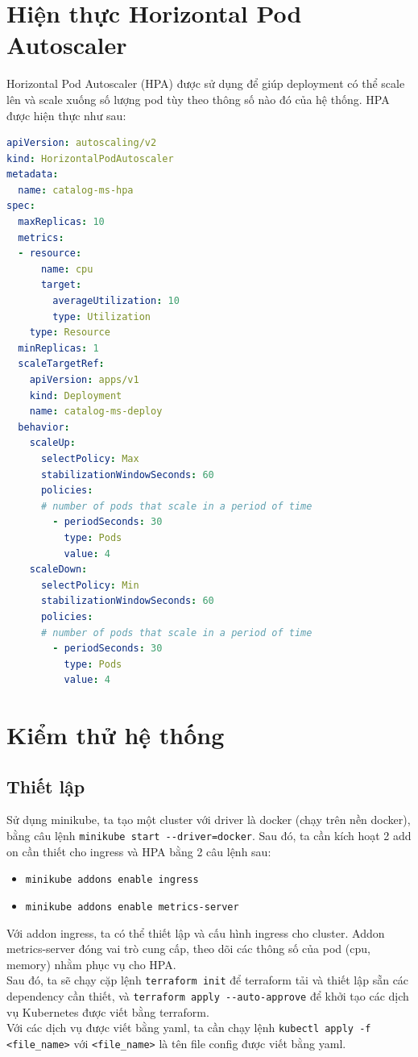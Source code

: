 \section{Hiện thực Horizontal Pod Autoscaler}
\noindent Horizontal Pod Autoscaler (HPA) được sử dụng để giúp deployment có thể scale lên và scale xuống số lượng pod tùy theo thông số nào đó của hệ thống. HPA được hiện thực như sau:
\begin{lstlisting}[language=yaml]
apiVersion: autoscaling/v2
kind: HorizontalPodAutoscaler
metadata:
  name: catalog-ms-hpa
spec:
  maxReplicas: 10
  metrics:
  - resource:
      name: cpu
      target:
        averageUtilization: 10
        type: Utilization
    type: Resource
  minReplicas: 1
  scaleTargetRef:
    apiVersion: apps/v1
    kind: Deployment
    name: catalog-ms-deploy
  behavior:
    scaleUp:
      selectPolicy: Max
      stabilizationWindowSeconds: 60
      policies:
      # number of pods that scale in a period of time
        - periodSeconds: 30
          type: Pods
          value: 4
    scaleDown:
      selectPolicy: Min
      stabilizationWindowSeconds: 60
      policies:
      # number of pods that scale in a period of time
        - periodSeconds: 30
          type: Pods
          value: 4
\end{lstlisting}
\section{Kiểm thử hệ thống}
\subsection{Thiết lập}
\noindent Sử dụng minikube, ta tạo một cluster với driver là docker (chạy trên nền docker), bằng câu lệnh \lstinline|minikube start --driver=docker|. Sau đó, ta cần kích hoạt 2 add on cần thiết cho ingress và HPA bằng 2 câu lệnh sau:
\begin{itemize}
  \item \lstinline|minikube addons enable ingress|
  \item \lstinline|minikube addons enable metrics-server|
\end{itemize}
Với addon ingress, ta có thể thiết lập và cấu hình ingress cho cluster. Addon metrics-server đóng vai trò cung cấp, theo dõi các thông số của pod (cpu, memory) nhằm phục vụ cho HPA.\\[0.5cm]
Sau đó, ta sẽ chạy cặp lệnh \lstinline|terraform init| để terraform tải và thiết lập sẵn các dependency cần thiết, và \lstinline|terraform apply --auto-approve| để khởi tạo các dịch vụ Kubernetes được viết bằng terraform.\\[0.5cm]
Với các dịch vụ được viết bằng yaml, ta cần chạy lệnh \lstinline|kubectl apply -f <file_name>| với \lstinline|<file_name>| là tên file config được viết bằng yaml.
